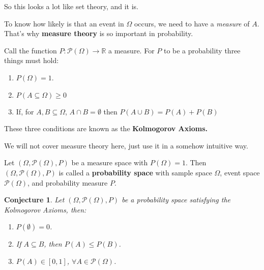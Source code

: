 \documentclass[aspectratio=169]{beamer}
\newtheorem{proposition}{Conjecture}[section]
\begin{document}
\begin{frame}
   
   So this looks a lot like set theory, and it is. \pause
   
   \vspace{0.5cm}
   
   To know how likely is that an event in $\Omega$ occurs, we need to have a \emph{measure} of $A$. That's why \textbf{measure theory} is so important in probability.\pause
   
   \vspace{0.5cm}
   
   Call the function $P:\mathcal{P}(\Omega)\rightarrow \mathbb{R}$ a measure. For $P$ to be a probability three things must hold:
   \begin{enumerate}
       \item $P(\Omega)=1$.
       \item $P(A\subseteq \Omega)\geq 0$
       \item If, for $A,B\subseteq\Omega$, $A\cap B = \emptyset$ then $P(A\cup B)=P(A)+P(B)$
   \end{enumerate}
   
   These three conditions are known as the \textbf{Kolmogorov Axioms.}\pause
   
   We will not cover measure theory here, just use it in a somehow intuitive way.
   
\end{frame}

\begin{frame}

    \begin{definition}
    Let $(\Omega, \mathcal{P}(\Omega),P)$ be a measure space with $P(\Omega)=1$. Then $(\Omega,\mathcal{P}(\Omega),P)$
 is called a \textbf{probability space} with sample space $\Omega$, event space $\mathcal{P}(\Omega)$, and probability measure $P$.
    \end{definition}
    \begin{proposition}
    
    Let $(\Omega, \mathcal{P}(\Omega), P)$ be a probability space satisfying the Kolmogorov Axioms, then:
    
    \begin{enumerate}
        \item $P(\emptyset)=0$.
        \item If $A\subseteq B$, then $P(A)\leq P(B)$.
        \item $P(A)\in [0,1]$, $\forall A\in\mathcal{P}(\Omega)$.
    \end{enumerate}

    \end{proposition}
    
    
\end{frame}
\end{document}
